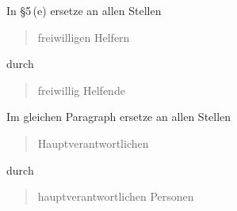 \documentclass[draft,10pt,oneside]{scrartcl}
\begin{document}
In §5\,(e) ersetze an allen Stellen
\begin{quote}
    freiwilligen Helfern
\end{quote}
durch
\begin{quote}
    freiwillig Helfende
\end{quote}
Im gleichen Paragraph ersetze an allen Stellen
\begin{quote}
    Hauptverantwortlichen
\end{quote}
durch
\begin{quote}
    hauptverantwortlichen Personen
\end{quote}
\end{document}
